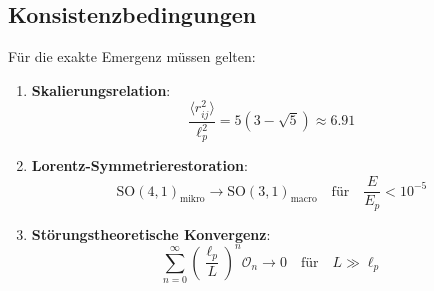 \subsection{Konsistenzbedingungen}
Für die exakte Emergenz müssen gelten:
\begin{enumerate}
\item \textbf{Skalierungsrelation}:
\begin{equation}
\frac{\langle r_{ij}^2 \rangle}{\ell_p^2} = 5(3-\sqrt{5}) \approx 6.91
\end{equation}

\item \textbf{Lorentz-Symmetrierestoration}:
\begin{equation}
\text{SO}(4,1)_{\text{mikro}} \to \text{SO}(3,1)_{\text{macro}} \quad \text{für} \quad \frac{E}{E_p} < 10^{-5}
\end{equation}

\item \textbf{Störungstheoretische Konvergenz}:
\begin{equation}
\sum_{n=0}^\infty \left( \frac{\ell_p}{L} \right)^n \mathcal{O}_n \to 0 \quad \text{für} \quad L \gg \ell_p
\end{equation}
\end{enumerate}